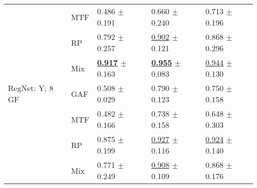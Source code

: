\begin{tabular}[t]{lllll}
 & MTF & \textcolor[rgb]{0.8357843137,0.1642156863,0}{0.486} $\pm$ \textcolor[rgb]{0.6819485050,0.3180514950,0}{0.191} & \textcolor[rgb]{0.9871624613,0.0128375387,0}{0.660} $\pm$ \textcolor[rgb]{1.0000000000,0.0000000000,0}{0.240} & \textcolor[rgb]{0.7984293194,0.2015706806,0}{0.713} $\pm$ \textcolor[rgb]{0.4651007353,0.5000000000,0}{0.196} \\
 & RP & \textcolor[rgb]{0.2426470588,0.5000000000,0}{0.792} $\pm$ \textcolor[rgb]{0.9202033436,0.0797966564,0}{0.257} & \underline{\textcolor[rgb]{0.1760231800,0.5000000000,0}{0.902}} $\pm$ \textcolor[rgb]{0.3351076707,0.5000000000,0}{0.121} & \textcolor[rgb]{0.3160994764,0.5000000000,0}{0.868} $\pm$ \textcolor[rgb]{0.9535567418,0.0464432582,0}{0.296} \\
 & Mix & \underline{\textbf{\textcolor[rgb]{0.0000000000,0.5000000000,0}{0.917}}} $\pm$ \textcolor[rgb]{0.5819876952,0.4180123048,0}{0.163} & \underline{\textbf{\textcolor[rgb]{0.0000000000,0.5000000000,0}{0.955}}} $\pm$ \textcolor[rgb]{0.1234823448,0.5000000000,0}{0.083} & \underline{\textcolor[rgb]{0.0785340314,0.5000000000,0}{0.944}} $\pm$ \textcolor[rgb]{0.1425478198,0.5000000000,0}{0.130} \\
RegNet: Y; 8 GF & GAF & \textcolor[rgb]{0.7926470588,0.2073529412,0}{0.508} $\pm$ \textcolor[rgb]{0.1031753909,0.5000000000,0}{0.029} & \textcolor[rgb]{0.5512495473,0.4487504527,0}{0.790} $\pm$ \textcolor[rgb]{0.3450987023,0.5000000000,0}{0.123} & \textcolor[rgb]{0.6832460733,0.3167539267,0}{0.750} $\pm$ \textcolor[rgb]{0.2807967733,0.5000000000,0}{0.158} \\
 & MTF & \textcolor[rgb]{0.8438725490,0.1561274510,0}{0.482} $\pm$ \textcolor[rgb]{0.5915852587,0.4084147413,0}{0.166} & \textcolor[rgb]{0.7250996016,0.2749003984,0}{0.738} $\pm$ \textcolor[rgb]{0.5420615539,0.4579384461,0}{0.158} & \textcolor[rgb]{1.0000000000,0.0000000000,0}{0.648} $\pm$ \textcolor[rgb]{0.9855288161,0.0144711839,0}{0.303} \\
 & RP & \textcolor[rgb]{0.0808823529,0.5000000000,0}{0.875} $\pm$ \textcolor[rgb]{0.7127864450,0.2872135550,0}{0.199} & \underline{\textcolor[rgb]{0.0929614874,0.5000000000,0}{0.927}} $\pm$ \textcolor[rgb]{0.3065600430,0.5000000000,0}{0.116} & \underline{\textcolor[rgb]{0.1433246073,0.5000000000,0}{0.924}} $\pm$ \textcolor[rgb]{0.1910808871,0.5000000000,0}{0.140} \\
 & Mix & \textcolor[rgb]{0.2830882353,0.5000000000,0}{0.771} $\pm$ \textcolor[rgb]{0.8901340965,0.1098659035,0}{0.249} & \underline{\textcolor[rgb]{0.1567065073,0.5000000000,0}{0.908}} $\pm$ \textcolor[rgb]{0.2692966353,0.5000000000,0}{0.109} & \textcolor[rgb]{0.3160994764,0.5000000000,0}{0.868} $\pm$ \textcolor[rgb]{0.3666690218,0.5000000000,0}{0.176} \\
\bottomrule
\end{tabular}

